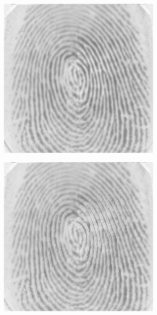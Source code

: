 \documentclass{beamer}
\begin{document}
{\begin{figure}[!ht]
\begin{subfigure}[ht]{0.15\textwidth}
        \end{subfigure}
    \end{figure}
    \begin{figure}[!ht]
        \centering
        \begin{subfigure}[ht]{0.15\textwidth}
            \includegraphics[width=\textwidth]{fingerprints/2000Db1a/2_6_src.jpg}
        \end{subfigure}
        \qquad
        \begin{subfigure}[ht]{0.15\textwidth}
            \includegraphics[width=\textwidth]{fingerprints/2000Db1a/2_6_background.jpg}

\end{subfigure}
\end{figure}}
\end{document}
